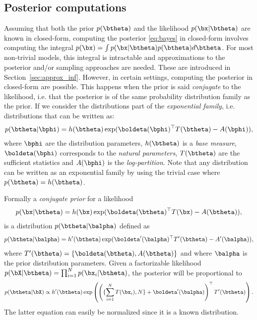 \subsection{Posterior computations}
\label{sec:posterior}
Assuming that both the prior $p(\btheta)$ and the likelihood $p(\bx|\btheta)$ are known in closed-form, computing the posterior \eqref{eq:bayes} in closed-form involves computing the integral $p(\bx)=\int p(\bx|\btheta)p(\btheta)d\btheta$.
For most non-trivial models, this integral is intractable and approximations to the posterior and/or sampling approaches are needed.
These are introduced in Section~\ref{sec:approx_inf}.
However, in certain settings, computing the posterior in closed-form are possible.
This happens when the prior is said \textit{conjugate} to the likelihood, i.e. that the posterior is of the same probability distribution family as the prior.
If we consider the distributions part of the \textit{exponential family}, i.e. distributions that can be written as:
\begin{align}
    p(\btheta|\bphi) = h(\btheta)\exp(\boldeta(\bphi)^\top T(\btheta) - A(\bphi)),
    \label{eq:expfamily}
\end{align}
where $\bphi$ are the distribution parameters, $h(\btheta)$ is a \textit{base measure}, $\boldeta(\bphi)$ corresponds to the \textit{natural parameters}, $T(\btheta)$ are the sufficient statistics and $A(\bphi)$ is the \textit{log-partition}.
Note that any distribution can be written as an exponential family by using the trivial case where $p(\btheta) =h(\btheta)$.

Formally a \textit{conjugate prior} for a likelihood
\begin{align}
    p(\bx|\btheta) = h(\bx)\exp(\boldeta(\btheta)^\top T(\bx) - A(\btheta)),
    \label{eq:explikelihood}
\end{align}
is a distribution $p(\btheta|\balpha)$ defined as
\begin{align}
    p(\btheta|\balpha) = h'(\btheta)\exp(\boldeta'(\balpha)^\top T'(\btheta) - A'(\balpha)),
    \label{eq:expprior}
\end{align}
where $T'(\btheta) = \left\{\boldeta(\btheta), A(\btheta)\right\}$ and where $\balpha$ is the prior distribution parameters.
Given a factorizable likelihood $p(\bX|\btheta) = \prod_{i=1}^N p(\bx_i|\btheta)$, the posterior will be proportional to
\begin{align*}
    p(\btheta|\bX) \propto h'(\btheta)\exp\left(\left(\{\sum_{i=1}^N T(\bx_i), N\} + \boldeta'(\balpha)\right)^\top T'(\btheta)\right).
\end{align*}
The latter equation can easily be normalized since it is a known distribution.


